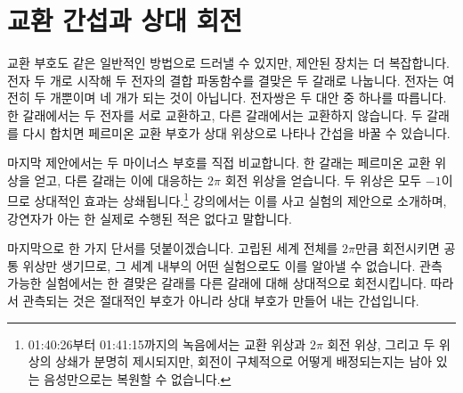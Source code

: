 \section{교환 간섭과 상대 회전}

교환 부호도 같은 일반적인 방법으로 드러낼 수 있지만, 제안된 장치는 더 복잡합니다. 전자 두 개로 시작해 두 전자의 결합 파동함수를 결맞은 두 갈래로 나눕니다. 전자는 여전히 두 개뿐이며 네 개가 되는 것이 아닙니다. 전자쌍은 두 대안 중 하나를 따릅니다. 한 갈래에서는 두 전자를 서로 교환하고, 다른 갈래에서는 교환하지 않습니다. 두 갈래를 다시 합치면 페르미온 교환 부호가 상대 위상으로 나타나 간섭을 바꿀 수 있습니다.

마지막 제안에서는 두 마이너스 부호를 직접 비교합니다. 한 갈래는 페르미온 교환 위상을 얻고, 다른 갈래는 이에 대응하는 \(2\pi\) 회전 위상을 얻습니다. 두 위상은 모두 \(-1\)이므로 상대적인 효과는 상쇄됩니다.\footnote{01:40:26부터 01:41:15까지의 녹음에서는 교환 위상과 \(2\pi\) 회전 위상, 그리고 두 위상의 상쇄가 분명히 제시되지만, 회전이 구체적으로 어떻게 배정되는지는 남아 있는 음성만으로는 복원할 수 없습니다.} 강의에서는 이를 사고 실험의 제안으로 소개하며, 강연자가 아는 한 실제로 수행된 적은 없다고 말합니다.

\begin{classroomqa}
\end{classroomqa}

마지막으로 한 가지 단서를 덧붙이겠습니다. 고립된 세계 전체를 \(2\pi\)만큼 회전시키면 공통 위상만 생기므로, 그 세계 내부의 어떤 실험으로도 이를 알아낼 수 없습니다. 관측 가능한 실험에서는 한 결맞은 갈래를 다른 갈래에 대해 상대적으로 회전시킵니다. 따라서 관측되는 것은 절대적인 부호가 아니라 상대 부호가 만들어 내는 간섭입니다.